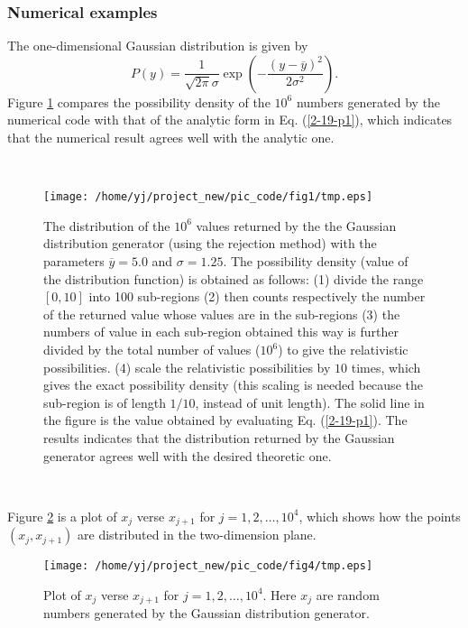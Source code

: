 \documentclass{article}
\begin{document}
\subsubsection{Numerical examples}

The one-dimensional Gaussian distribution is given by
\begin{equation}
  \label{2-19-p1} P (y) = \frac{1}{\sqrt{2 \pi} \sigma} \exp \left( - \frac{(y
  - \overline{y})^2}{2 \sigma^2} \right) .
\end{equation}
Figure \ref{1-22-3} compares the possibility density of the $10^6$ numbers
generated by the numerical code with that of the analytic form in Eq.
(\ref{2-19-p1}), which indicates that the numerical result agrees well with
the analytic one.

\

\begin{figure}[h]
  \texttt{[image: /home/yj/project\_new/pic\_code/fig1/tmp.eps]}
  \caption{\label{1-22-3}The distribution of the $10^6$ values returned by the
  the Gaussian distribution generator (using the rejection method) with the
  parameters $\overline{y} = 5.0$ and $\sigma = 1.25$. The possibility density
  (value of the distribution function) is obtained as follows: (1) divide the
  range $[0, 10]$ into 100 sub-regions (2) then counts respectively the number
  of the returned value whose values are in the sub-regions (3) the numbers of
  value in each sub-region obtained this way is further divided by the total
  number of values ($10^6$) to give the relativistic possibilities. (4) scale
  the relativistic possibilities by $10$ times, which gives the exact
  possibility density (this scaling is needed because the sub-region is of
  length $1 / 10$, instead of unit length). The solid line in the figure is
  the value obtained by evaluating Eq. (\ref{2-19-p1}). The results indicates
  that the distribution returned by the Gaussian generator agrees well with
  the desired theoretic one.}
\end{figure}

\

Figure \ref{1-22-4} is a plot of $x_j$ verse $x_{j + 1}$ for $j = 1, 2,
\ldots, 10^4$, which shows how the points $(x_j, x_{j + 1})$ are distributed
in the two-dimension plane.

\begin{figure}[h]
  \texttt{[image: /home/yj/project\_new/pic\_code/fig4/tmp.eps]}
  \caption{\label{1-22-4}Plot of $x_j$ verse $x_{j + 1}$ for $j = 1, 2,
  \ldots, 10^4$. Here $x_j$ are random numbers generated by the Gaussian
  distribution generator.}
\end{figure}
\end{document}
